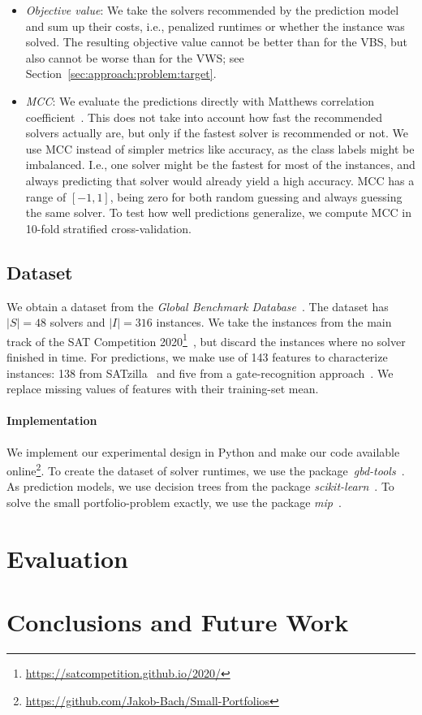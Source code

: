 \documentclass[conference]{IEEEtran}
\begin{document}
\begin{itemize}
	\item \emph{Objective value}:
	We take the solvers recommended by the prediction model and sum up their costs, i.e., penalized runtimes or whether the instance was solved.
	The resulting objective value cannot be better than for the VBS, but also cannot be worse than for the VWS; see Section~\ref{sec:approach:problem:target}.
	\item \emph{MCC}:
	We evaluate the predictions directly with Matthews correlation coefficient~\cite{matthews1975comparison, gorodkin2004comparing}.
	This does not take into account how fast the recommended solvers actually are, but only if the fastest solver is recommended or not.
	We use MCC instead of simpler metrics like accuracy, as the class labels might be imbalanced.
	I.e., one solver might be the fastest for most of the instances, and always predicting that solver would already yield a high accuracy.
	MCC has a range of $[-1,1]$, being zero for both random guessing and always guessing the same solver.
	To test how well predictions generalize, we compute MCC in 10-fold stratified cross-validation.
\end{itemize}

\subsection{Dataset}

We obtain a dataset from the \emph{Global Benchmark Database}~\cite{iser2020collaborative}.
The dataset has $|S| = 48$ solvers and $|I| = 316$ instances.
We take the instances from the main track of the SAT Competition 2020\footnote{\url{https://satcompetition.github.io/2020/}}~\cite{balyo2020proceedings}, but discard the instances where no solver finished in time.
For predictions, we make use of 143 features to characterize instances:
138 from SATzilla~\cite{xu2008satzilla, xu2012satzilla2012} and five from a gate-recognition approach~\cite{iser2020recognition}.
We replace missing values of features with their training-set mean.


\paragraph{Implementation}

We implement our experimental design in Python and make our code available online\footnote{\url{https://github.com/Jakob-Bach/Small-Portfolios}}.
To create the dataset of solver runtimes, we use the package~\emph{gbd-tools}~\cite{iser2020collaborative}.
As prediction models, we use decision trees from the package \emph{scikit-learn}~\cite{scikit-learn}.
To solve the small portfolio-problem exactly, we use the package \emph{mip}~\cite{python-mip}.

\section{Evaluation}
\label{sec:evaluation}

\section{Conclusions and Future Work}
\label{sec:conclusion}




\end{document}
